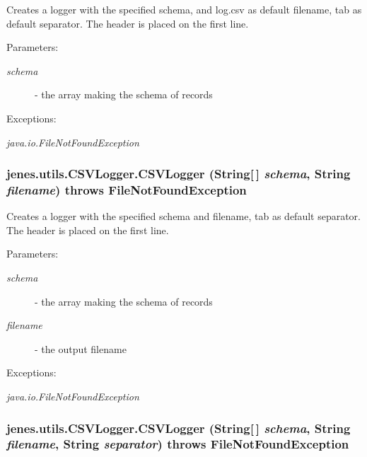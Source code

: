 Creates a logger with the specified schema, and log.csv as default filename, tab as default separator. The header is placed on the first line.

\begin{Desc}
\item[Parameters:]
\begin{description}
\item[{\em schema}]- the array making the schema of records \end{description}
\end{Desc}
\begin{Desc}
\item[Exceptions:]
\begin{description}
\item[{\em java.io.FileNotFoundException}]\end{description}
\end{Desc}
\hypertarget{classjenes_1_1utils_1_1_c_s_v_logger_52ccc76492a8a16e018198bcfa702360}{
\subsubsection[CSVLogger]{\setlength{\rightskip}{0pt plus 5cm}jenes.utils.CSVLogger.CSVLogger (String\mbox{[}$\,$\mbox{]} {\em schema}, \/  String {\em filename})  throws FileNotFoundException }}
\label{classjenes_1_1utils_1_1_c_s_v_logger_52ccc76492a8a16e018198bcfa702360}


Creates a logger with the specified schema and filename, tab as default separator. The header is placed on the first line.

\begin{Desc}
\item[Parameters:]
\begin{description}
\item[{\em schema}]- the array making the schema of records \item[{\em filename}]- the output filename \end{description}
\end{Desc}
\begin{Desc}
\item[Exceptions:]
\begin{description}
\item[{\em java.io.FileNotFoundException}]\end{description}
\end{Desc}
\hypertarget{classjenes_1_1utils_1_1_c_s_v_logger_d6242d77cf75372bfbf55e9b0973bfb4}{
\subsubsection[CSVLogger]{\setlength{\rightskip}{0pt plus 5cm}jenes.utils.CSVLogger.CSVLogger (String\mbox{[}$\,$\mbox{]} {\em schema}, \/  String {\em filename}, \/  String {\em separator})  throws FileNotFoundException }}
\label{classjenes_1_1utils_1_1_c_s_v_logger_d6242d77cf75372bfbf55e9b0973bfb4}


